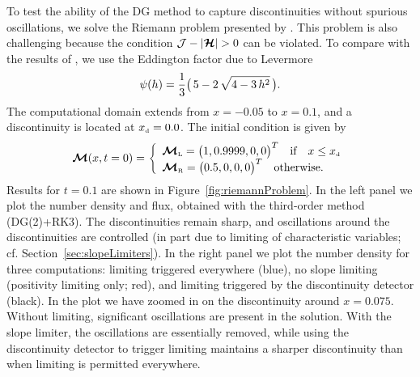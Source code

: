 \documentclass[10pt,preprint]{aastex}
\begin{document}
To test the ability of the DG method to capture discontinuities without spurious oscillations, we solve the Riemann problem presented by \citet{OHF2012}.  
This problem is also challenging because the condition $\cJ-|\bcH|>0$ can be violated.  
To compare with the results of \citet{OHF2012}, we use the Eddington factor due to Levermore \citep{levermore_1984}
\begin{equation}
  \psi(h)=\frac{1}{3}\big(\,5-2\,\sqrt{4-3\,h^{2}}\,\big).  
  \label{eq:eddingtonFactorLevermore}
\end{equation}
The computational domain extends from $x=-0.05$ to $x=0.1$, and a discontinuity is located at $x_{\mbox{\tiny d}}=0.0$.  
The initial condition is given by
\begin{equation}
  \boldsymbol{\mathcal{M}}(x,t=0)=
  \left\{
  \begin{array}{l}
  \boldsymbol{\mathcal{M}}_{\mbox{\tiny L}}=\big(1,0.9999,0,0\big)^{T} \quad\text{if}\quad x\le x_{\mbox{\tiny d}} \\
  \boldsymbol{\mathcal{M}}_{\mbox{\tiny R}}=\big(0.5,0,0,0\big)^{T} \quad\text{otherwise}.
  \end{array}
  \right.
  \label{eq:riemannProblem}
\end{equation}
Results for $t=0.1$ are shown in Figure~\ref{fig:riemannProblem}.  
In the left panel we plot the number density and flux, obtained with the third-order method (DG(2)+RK3).  
The discontinuities remain sharp, and oscillations around the discontinuities are controlled (in part due to limiting of characteristic variables; cf. Section~\ref{sec:slopeLimiters}).  
In the right panel we plot the number density for three computations: limiting triggered everywhere (blue), no slope limiting (positivity limiting only; red), and limiting triggered by the discontinuity detector (black).  
In the plot we have zoomed in on the discontinuity around $x=0.075$.  
Without limiting, significant oscillations are present in the solution.  
With the slope limiter, the oscillations are essentially removed, while using the discontinuity detector to trigger limiting maintains a sharper discontinuity than when limiting is permitted everywhere.  
\end{document}
